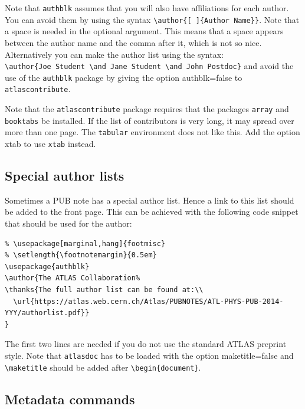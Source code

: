 \documentclass[atlasstyle,UKenglish]{latex/atlasdoc}
\newcommand{\Macro}[1]{\texttt{\textbackslash #1}\xspace}
\newcommand{\Option}[1]{\textsf{#1}\xspace}
\newcommand{\Package}[1]{\texttt{#1}\xspace}
\begin{document}
Note that \Package{authblk} assumes that you will also have affiliations for each author.
You can avoid them by using the syntax \verb|\author{[ ]{Author Name}}|.
Note that a space is needed in the optional argument.
This means that a space appears between the author name and the comma after it, which is not so nice.
Alternatively you can make the author list using the syntax:\\
\verb|\author{Joe Student \and Jane Student \and John Postdoc}| and avoid the use of the
\Package{authblk} package by giving the option \Option{authblk=false} to \Package{atlascontribute}.

Note that the \Package{atlascontribute} package requires that the packages 
\Package{array} and \Package{booktabs} be installed.
If the list of contributors is very long, it may spread over more than one page.
The \Package{tabular} environment does not like this.
Add the option \Option{xtab} to use \Package{xtab} instead.


\subsection{Special author lists}

Sometimes a PUB note has a special author list.
Hence a link to this list should be added to the front page.
This can be achieved with the following code snippet that should be used for the author:
\begin{verbatim}
% \usepackage[marginal,hang]{footmisc}
% \setlength{\footnotemargin}{0.5em}
\usepackage{authblk}
\author{The ATLAS Collaboration%
\thanks{The full author list can be found at:\\
  \url{https://atlas.web.cern.ch/Atlas/PUBNOTES/ATL-PHYS-PUB-2014-YYY/authorlist.pdf}}
}
\end{verbatim}

The first two lines are needed if you do not use the standard ATLAS preprint style.
Note that \Package{atlasdoc} has to be loaded with the option \Option{maketitle=false}
and \Macro{maketitle} should be added after \verb|\begin{document}|.


\subsection{Metadata commands}
\end{document}
